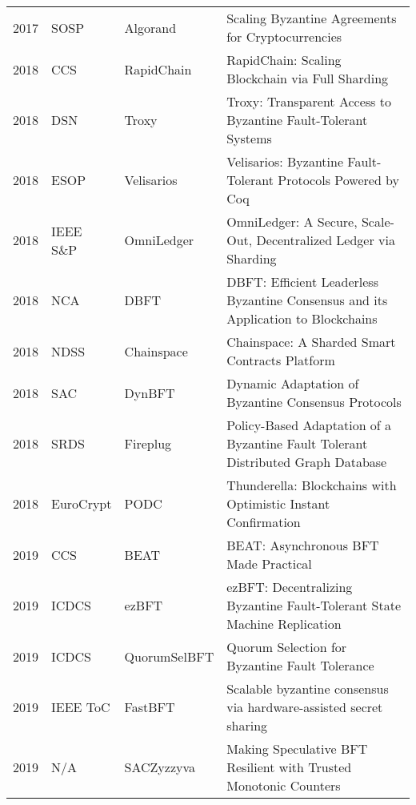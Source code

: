 \documentclass{article}
\begin{document}
\begin{landscape}
\begin{table}[]
{\begin{tabular}{llll}
2017 & SOSP              & Algorand       & Scaling Byzantine Agreements for Cryptocurrencies                                         \\
2018 & CCS               & RapidChain     & RapidChain: Scaling Blockchain via Full Sharding                                          \\
2018 & DSN               & Troxy          & Troxy: Transparent Access to Byzantine Fault-Tolerant Systems                             \\
2018 & ESOP              & Velisarios     & Velisarios: Byzantine Fault-Tolerant Protocols Powered by Coq                             \\
2018 & IEEE S\&P         & OmniLedger     & OmniLedger: A Secure, Scale-Out, Decentralized Ledger via Sharding                        \\
2018 & NCA               & DBFT           & DBFT: Efficient Leaderless Byzantine Consensus and its Application to Blockchains         \\
2018 & NDSS              & Chainspace     & Chainspace: A Sharded Smart Contracts Platform                                            \\
2018 & SAC               & DynBFT         & Dynamic Adaptation of Byzantine Consensus Protocols                                       \\
2018 & SRDS              & Fireplug       & Policy-Based Adaptation of a Byzantine Fault Tolerant Distributed Graph Database          \\
2018 & EuroCrypt         & PODC           & Thunderella: Blockchains with Optimistic Instant Confirmation                             \\
2019 & CCS               & BEAT           & BEAT: Asynchronous BFT Made Practical                                                     \\
2019 & ICDCS             & ezBFT          & ezBFT: Decentralizing Byzantine Fault-Tolerant State Machine Replication                  \\
2019 & ICDCS             & QuorumSelBFT   & Quorum Selection for Byzantine Fault Tolerance                                            \\
2019 & IEEE ToC          & FastBFT        & Scalable byzantine consensus via hardware-assisted secret sharing                         \\
2019 & N/A               & SACZyzzyva     & Making Speculative BFT Resilient with Trusted Monotonic Counters                          \\

\end{tabular}}
\end{table}
\end{landscape}
\end{document}
